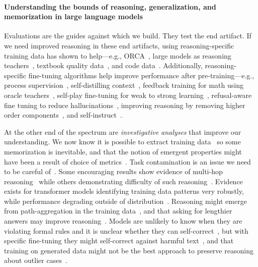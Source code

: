 \documentclass[11pt,a4paper]{article}
\begin{document}
\paragraph{Understanding the bounds of reasoning, generalization, and
memorization in large language models}
Evaluations are the guides against which we build. They test the end artifact.
If we need improved reasoning in these end artifacts, using reasoning-specific
training data has shown to help---e.g., ORCA~\cite{orca,orca2},
large models as reasoning teachers~\cite{large-reasoning-teachers},
textbook quality data~\cite{textbooks}, and code data~\cite{code-training-helps}.
Additionally, reasoning-specific fine-tuning
algorithms help improve performance after pre-training---e.g.,
process supervision~\cite{process-supervision,math-shepherd},
self-distilling context~\cite{self-distilling-context},
feedback training for math using oracle teachers~\cite{rest-self-training-oracle, rest-multistep-self-training},
self-play fine-tuning for weak to strong learning~\cite{self-play-for-weak-to-strong},
refusal-aware fine tuning to reduce hallucinations~\cite{refusal-aware},
improving reasoning by removing higher order components~\cite{laser-remove-higher-order-weight-components},
and self-instruct~\cite{self-instruct}.

At the other end of the spectrum are {\em investigative analyses}
that improve our understanding.
We now know it is possible to extract training
data~\cite{extract-training-data} so some memorization is inevitable, and that
the notion of emergent properties might have been a result of choice of
metrics~\cite{emergent-mirage}. Task contamination is an issue we need to
be careful of~\cite{task-contamination}.  Some encouraging results show evidence
of multi-hop reasoning~\cite{multi-hop-reasoning} while others demonstrating
difficulty of such reasoning~\cite{reasoning-multiple-facts}.  Evidence exists
for transformer models identifying training data patterns very robustly, while
performance degrading outside of distribution~\cite{ood-hard}. Reasoning might
emerge from path-aggregation in the training
data~\cite{path-aggregation-leads-to-reasoning}, and that asking for lengthier
answers may improve reasoning~\cite{length-improves}.  Models are unlikely to
know when they are violating formal rules and it is unclear whether they can
self-correct~\cite{cant-find-errors-but-correct,cannot-self-correct,dont-know-wrong},
but with specific fine-tuning they might self-correct against harmful
text~\cite{moral-self-correction}, and that training on generated data might
not be the best approach to preserve reasoning about outlier
cases~\cite{gen-data-makes-models-forget}.
\end{document}
